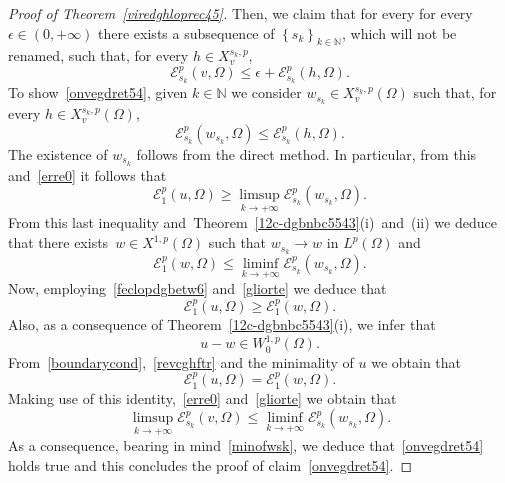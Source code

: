 \documentclass[12pt]{article}
\newcommand{\N}{\mathbb{N}}
\numberwithin{equation}{section}
\renewcommand{\leq}{\leqslant}
\renewcommand{\geq}{\geqslant}
\begin{document}
\begin{proof}[Proof of Theorem~\ref{viredghloprec45}]
Then, we claim that for every for every $\epsilon\in (0,+\infty)$ there exists a subsequence of $\left\lbrace s_k \right\rbrace_{k\in\N}$, which will not be renamed, such that, for every $h\in X_v^{s_k,p}$, 
\begin{equation}\label{onvegdret54}
\mathcal{E}_{s_k}^p(v,\Omega)\leq \epsilon+\mathcal{E}_{s_k}^p(h,\Omega). 
\end{equation}
To show~\eqref{onvegdret54}, given $k\in\N$ we consider $w_{s_k}\in X_v^{s_k,p}(\Omega)$ such that, for every $h \in X_v^{s_k,p}(\Omega)$,
\begin{equation}\label{minofwsk}
\mathcal{E}_{s_k}^p(w_{s_k},\Omega)\leq \mathcal{E}_{s_k}^p(h,\Omega).
\end{equation}
The existence of $w_{s_k}$ follows from the direct method. In particular, from this and~\eqref{erre0} it follows that 
\begin{equation}\label{feclopdgbetw6}
\mathcal{E}_{1}^p(u,\Omega)\geq \limsup_{k\to+\infty} \mathcal{E}_{s_k}^p(w_{s_k},\Omega).
\end{equation}
From this last inequality and~Theorem~\ref{12c-dgbnbc5543}(i)~and~(ii) we deduce that there exists~$w \in X^{1,p}(\Omega)$ such that $w_{s_k}\to w$ in $L^p(\Omega)$ and 
\begin{equation}\label{gliorte}
\mathcal{E}_1^p(w,\Omega)\leq \liminf_{k\to+\infty}\mathcal{E}_{s_k}^p(w_{s_k},\Omega). 
\end{equation}
Now, employing~\eqref{feclopdgbetw6} and~\eqref{gliorte} we deduce that 
\begin{equation}\label{revcghftr}
\mathcal{E}_1^p(u,\Omega)\geq \mathcal{E}_1^p(w,\Omega). 
\end{equation}
Also, as a consequence of Theorem~\ref{12c-dgbnbc5543}(i), we infer that
\begin{equation}\label{boundarycond}
u-w\in W_0^{1,p}(\Omega).
\end{equation}
From~\eqref{boundarycond},~\eqref{revcghftr} and the minimality of $u$ we obtain that 
\begin{equation*}
\mathcal{E}_1^p(u,\Omega)=\mathcal{E}_1^p(w,\Omega).
\end{equation*} 
Making use of this identity,~\eqref{erre0} and~\eqref{gliorte} we obtain that 
\begin{equation*}
\limsup_{k\to+\infty}\mathcal{E}_{s_k}^p(v,\Omega)\leq \liminf_{k\to+\infty} \mathcal{E}_{s_k}^p(w_{s_k},\Omega). 
\end{equation*}
As a consequence, bearing in mind~\eqref{minofwsk}, we deduce that~\eqref{onvegdret54} holds true and this concludes the proof of claim~\eqref{onvegdret54}. 


\end{proof}
\end{document}
